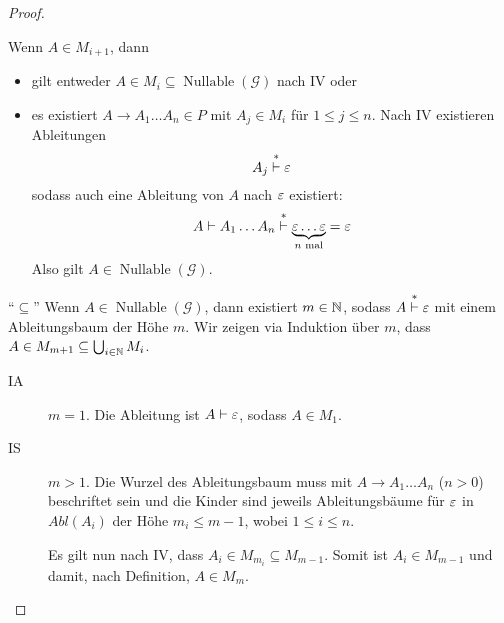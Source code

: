 \begin{proof}
\begin{description}
    Wenn $A \in M_{i+1}$, dann
    \begin{itemize}
    \item gilt entweder
      $A \in M_i \subseteq \operatorname{Nullable}(\mathcal{G})$ nach
      IV oder
    \item 
      es existiert $A \to A_1\ldots A_n \in P$ mit $A_j \in M_i$ für
      $1 \le j \le n$.
      Nach IV existieren Ableitungen
      \begin{displaymath}
        A_j \stackrel{*}{\vdash} \varepsilon
      \end{displaymath}
      sodass auch eine Ableitung von $A$ nach $\varepsilon$ existiert:
      \begin{displaymath}
        A  \vdash A_1 \ldots A_n \stackrel{*}{\vdash} \underbrace{\varepsilon \ldots \varepsilon}_{n \text{ mal}} = \varepsilon
      \end{displaymath}
      Also gilt $A \in \operatorname{Nullable}(\mathcal{G})$.
    \end{itemize}
  \end{description}

  \medskip
  
  "`$\subseteq$"'\quad
  Wenn $A \in \operatorname{Nullable}(\mathcal{G})$, dann existiert $m
  \in \mathbb{N}$, sodass $A \stackrel{*}{\vdash} \varepsilon$ mit einem
  Ableitungsbaum der Höhe $m$.
  Wir zeigen via Induktion über $m$, dass $A \in M_{m+1} \subseteq \bigcup_{i \in \mathbb{N}} M_i$.
  \begin{description}
  \item[IA] $m = 1$. Die Ableitung ist $A \vdash \varepsilon$, sodass $A\in M_1$.
  \item[IS] $m > 1$.
    Die Wurzel des Ableitungsbaum muss mit $A \to A_1\ldots A_n$ ($n>0$)
    beschriftet sein und die Kinder sind jeweils Ableitungsbäume für
    $\varepsilon$ in  $Abl(A_i)$ der Höhe $m_i \le m-1$, wobei $1 \le i \le n$.
    
    Es gilt nun nach IV, dass $A_i \in M_{m_i} \subseteq M_{m-1}$.
    Somit ist $A_i \in M_{m-1}$ und damit, nach Definition, $A \in M_m$.
    \qedhere
  \end{description}
\end{proof}

